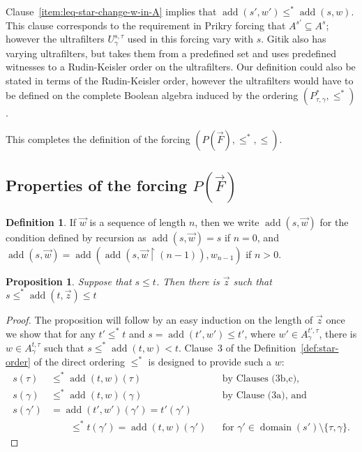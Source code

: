 \documentclass[
twoside,
]{article}
\newtheorem{proposition}[theorem]{Proposition}
\theoremstyle{definition}
\newtheorem{definition}[theorem]{Definition}
\theoremstyle{remark}
\DeclareMathOperator{\add}{add}
\newcommand{\sing}[1]{\{#1\}}
\newcommand{\restrict}{{\upharpoonright}}
\DeclareMathOperator{\domain}{domain}
\begin{document}
Clause~\ref{item:leq-star-change-w-in-A} implies that $\add(s',w')\leq^*
\add(s,w)$.   This clause
 corresponds to the requirement
in Prikry forcing that $A^{s'}\subseteq A^{s}$; however the
ultrafilters $U^{s,\tau}_{\gamma}$ used in this forcing vary with
$s$.  Gitik \cite{Gitik2005No-bound-for-th} also has varying
ultrafilters, but takes them from a predefined set and uses
predefined witnesses to a Rudin-Keisler order on the ultrafilters.
Our definition could also be stated in terms of the Rudin-Keisler
order,
however the  ultrafilters would have to be defined on the
complete Boolean algebra induced by the ordering $(P^*_{\tau,\gamma},\leq^*)$.

\medskip{}


This completes the definition of  the forcing
$(P(\vec F), {\leq^*}, {\leq})$.

\subsection{Properties of the forcing $P(\vec F)$}
\label{sec:PFproperties}

\begin{definition}
  If $\vec w$ is a  sequence of length $n$, then we write
  $\add(s,\vec w)$ for the condition defined by recursion as
  $\add(s,\vec w)=s$ if $n=0$, and $\add(s,\vec w) =\add(\add(s,\vec
  w\restrict (n-1)), w_{n-1})$ if $n>0$.
\end{definition}

\begin{proposition}\label{thm:one-stepFirst}
  Suppose that $s\leq t$. Then
  there is $\vec z$ such that
  $s\leq^*\add(t,\vec z)\leq t$
\end{proposition}
\begin{proof}
  The proposition will  follow by an easy
  induction on the length of $\vec z$ once we show that for any $t'\leq^* t$ and
  $s=\add(t',w')\leq t'$, where $w'\in A^{t',\tau}_{\gamma}$,  there is  $ w\in A^{t,\tau}_{\gamma}$ such
  that $s\leq^* \add(t, w)<t$.    Clause~3 of
  the Definition~\ref{def:star-order} of  
  the direct ordering $\leq^*$ is designed to provide such a $w$:
  \begin{align*}
    s(\tau)&\le^* \add(t, w)(\tau)&&\text{by Clauses~(3b,c),}\\
    s(\gamma)&\leq^*\add(t,  w)(\gamma)&&\text{by Clause~(3a), and}\\
    s(\gamma')&=\add(t',w')(\gamma')=t'(\gamma')\\
    &\qquad\leq^*t(\gamma')=\add(t,w)(\gamma')                                  &&\text{for
                                     $\gamma'\in\domain(s')\setminus\sing{\tau,\gamma}$.}    
  \end{align*}
\end{proof}
\end{document}
